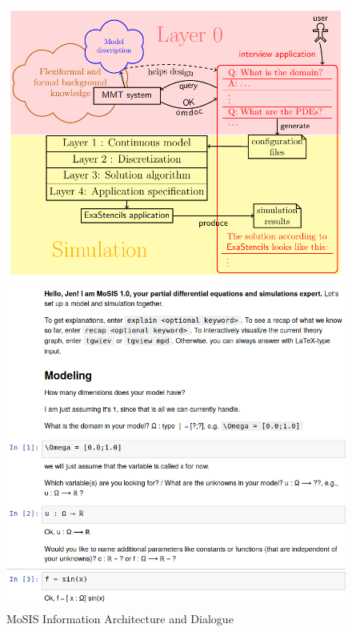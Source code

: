 \begin{figure}[ht]\centering
  \begin{minipage}[c]{.49\textwidth}
    \includegraphics[width=\textwidth]{../D4.11/proto}
  \end{minipage}
  \begin{minipage}[c]{.49\textwidth}
    \includegraphics[width=\textwidth]{../D4.11/Screenshot_interview}
  \end{minipage}
  \caption{MoSIS Information Architecture and Dialogue}\label{fig:prototype}
\end{figure}


